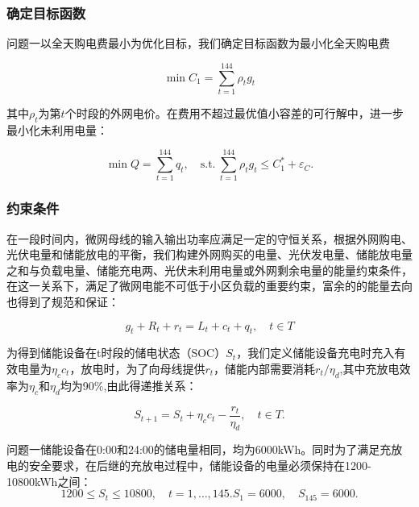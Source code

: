 \documentclass{cumcm2026}
\begin{document}
\subsubsection{确定目标函数}

问题一以全天购电费最小为优化目标，我们确定目标函数为最小化全天购电费

\begin{equation}
  \min C_1=\sum_{t=1}^{144}\rho_t g_t
\end{equation}

其中$\rho_t$为第$t$个时段的外网电价。在费用不超过最优值小容差的可行解中，进一步最小化未利用电量：

\begin{equation}
  \min Q=\sum_{t=1}^{144}q_t,\quad \mathrm{s.t.}\ \sum_{t=1}^{144}\rho_t g_t\leq C_1^*+\varepsilon_C.
\end{equation}

\subsubsection{约束条件}


在一段时间内，微网母线的输入输出功率应满足一定的守恒关系，根据外网购电、光伏电量和储能放电的平衡，我们构建外网购买的电量、光伏发电量、储能放电量之和与负载电量、储能充电两、光伏未利用电量或外网剩余电量的能量约束条件，在这一关系下，满足了微网电能不可低于小区负载的重要约束，富余的的能量去向也得到了规范和保证：

\begin{equation}
  g_t+R_t+r_t=L_t+c_t+q_t,\quad t\in T
\label{pingheng}
\end{equation}


为得到储能设备在t时段的储电状态（SOC）$S_t$，我们定义储能设备充电时充入有效电量为$\eta_cc_t$，放电时，为了向母线提供$r_t$，储能内部需要消耗$r_t/\eta_d$,其中充放电效率为$\eta_c$和$\eta_d$均为90\%,由此得递推关系\cite{plett2015battery}：

\begin{equation}
  S_{t+1}=S_t+\eta_c c_t-\frac{r_t}{\eta_d},\quad t\in T.
\end{equation}


问题一储能设备在0:00和24:00的储电量相同，均为6000kWh。同时为了满足充放电的安全要求，在后继的充放电过程中，储能设备的电量必须保持在1200-10800kWh之间：
$$
  1200\leq S_t\leq10800,\quad t=1,\ldots,145.
  S_1=6000,\quad S_{145}=6000.
$$
\end{document}
